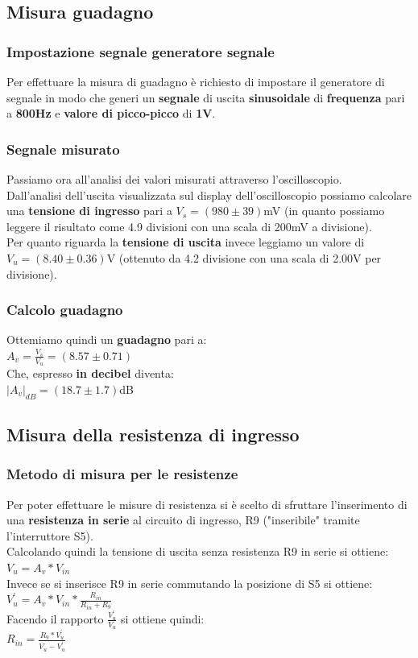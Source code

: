 \documentclass{article}
\begin{document}
\subsection{Misura guadagno}
\subsubsection{Impostazione segnale generatore segnale}
Per effettuare la misura di guadagno è richiesto di impostare il generatore di segnale in modo che generi un \textbf{segnale} di uscita \textbf{sinusoidale} di \textbf{frequenza} pari a \textbf{800Hz} e \textbf{valore di picco-picco} di \textbf{1V}.

\subsubsection{Segnale misurato}
Passiamo ora all'analisi dei valori misurati attraverso l'oscilloscopio.\\Dall'analisi dell'uscita visualizzata sul display dell'oscilloscopio possiamo calcolare una \textbf{tensione di ingresso} pari a \large $V_s = (980 \pm 39)$mV \normalsize (in quanto possiamo leggere il risultato come 4.9 divisioni con una scala di 200mV a divisione).\\
Per quanto riguarda la \textbf{tensione di uscita} invece leggiamo un valore di \large $V_u = (8.40 \pm 0.36)$V \normalsize (ottenuto da 4.2 divisione con una scala di 2.00V per divisione).
\subsubsection{Calcolo guadagno}
Ottemiamo quindi un \textbf{guadagno} pari a:\\ \large $A_v = \frac{V_s}{V_u} = (8.57 \pm 0.71)$ \normalsize \\Che, espresso \textbf{in decibel} diventa:\\ \large $ |A_v|_{dB} = (18.7 \pm 1.7)$dB \normalsize

\subsection{Misura della resistenza di ingresso}
\subsubsection{Metodo di misura per le resistenze}
Per poter effettuare le misure di resistenza si è scelto di sfruttare l'inserimento di una \textbf{resistenza in serie} al circuito di ingresso, R9 ("inseribile" tramite l'interruttore S5).\\Calcolando quindi la tensione di uscita senza resistenza R9 in serie si ottiene:\\
\large $V_{u} = A_{v} * V_{in}$ \normalsize \\ Invece se si inserisce R9 in serie commutando la posizione di S5 si ottiene:\\
\large $ V_{u}^{'} = A_{v} * V_{in} * \frac{R_{in}}{R_{in} + R_9} $ \normalsize \\ Facendo il rapporto \large $\frac{V_{u}^{'}}{{V_u}}$ \normalsize si ottiene quindi: \\ \large $R_{in} = \frac{R_9 * V_{u}^{'}}{V_u - V_{u}^{'}} $
\end{document}
